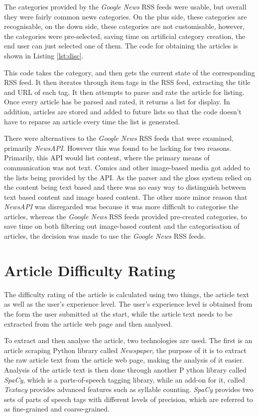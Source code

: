 The categories provided by the \textit{Google News} RSS feeds were usable, but overall they were fairly common news categories. On the plus side, these categories are recognisable, on the down side, these categories are not customisable, however, the categories were pre-selected, saving time on artificial category creation, the end user can just selected one of them. The code for obtaining the articles is shown in Listing \ref{lst:disc}.



This code takes the category, and then gets the current state of the corresponding RSS feed. It then iterates through item tags in the RSS feed, extracting the title and URL of each tag. It then attempts to parse and rate the article for listing. Once every article has be parsed and rated, it returns a list for display. In addition, articles are stored and added to future lists so that the code doesn't have to reparse an article every time the list is generated.

There were alternatives to the \textit{Google News} RSS feeds that were examined, primarily \textit{NewsAPI}. However this was found to be lacking for two reasons. Primarily, this API would list content, where the primary means of communication was not text. Comics and other image-based media got added to the lists being provided by the API. As the parser and the gloss system relied on the content being text based and there was no easy way to distinguish between text based content and image based content. The other more minor reason that \textit{NewsAPI} was disregarded was because it was more difficult to categorise the articles, whereas the \textit{Google News} RSS feeds provided pre-created categories, to save time on both filtering out image-based content and the categorisation of articles, the decision was made to use the \textit{Google News} RSS feeds. 


\section{Article Difficulty Rating}

The difficulty rating of the article is calculated using two things, the article text as well as the user's experience level. The user's experience level is obtained from the form the user submitted at the start, while the article text needs to be extracted from the article web page and then analysed.

To extract and then analyse the article, two technologies are used. The first is an article scraping Python library called \textit{Newspaper}, the purpose of it is to extract the raw article text from the article web page, making the analysis of it easier. Analysis of the article text is then done through another P ython library called \textit{SpaCy}, which is a parts-of-speech tagging library, while an add-on for it, called \textit{Textacy} provides advanced features such as syllable counting. \textit{SpaCy} provides two  sets of parts of speech tags with different levels of precision, which are referred to as fine-grained and coarse-grained.

